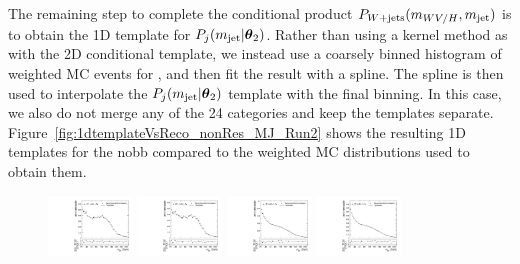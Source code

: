 The remaining step to complete the conditional product $P_{W+\text{jets}}(m_{WV/H},m_\mathrm{jet})$ is to obtain the 1D template for $P_j(m_\mathrm{jet}|\vb*{\theta}_2)$.
Rather than using a kernel method as with the 2D conditional template, we instead use a coarsely binned histogram of weighted MC events for \MJ, and then fit the result with a spline.
The spline is then used to interpolate the $P_j(m_\mathrm{jet}|\vb*{\theta}_2)$ template with the final \MJ binning.
In this case, we also do not merge any of the 24 categories and keep the templates separate.
Figure~\ref{fig:1dtemplateVsReco_nonRes_MJ_Run2} shows the resulting 1D templates for the nobb compared to the weighted MC distributions used to obtain them.

\begin{figure}[htbp]
  \centering
  \includegraphics[width=0.2\textwidth]{fig/2Dfit/templateVsReco_nonRes_r0_MJ_mu_HP_nobb_LDy.pdf}
  \includegraphics[width=0.2\textwidth]{fig/2Dfit/templateVsReco_nonRes_r0_MJ_e_HP_nobb_LDy.pdf}
  \includegraphics[width=0.2\textwidth]{fig/2Dfit/templateVsReco_nonRes_r0_MJ_mu_LP_nobb_LDy.pdf}
  \includegraphics[width=0.2\textwidth]{fig/2Dfit/templateVsReco_nonRes_r0_MJ_e_LP_nobb_LDy.pdf}\\

\end{figure}
